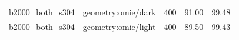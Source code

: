 \begin{longtable}{l>{\raggedright\arraybackslash}p{.42\linewidth}rrr}
b2000\_\allowbreak{}both\_\allowbreak{}s304 & %
geometry:omie/dark & %
400 & %
91.00 & %
99.48 \\ %

b2000\_\allowbreak{}both\_\allowbreak{}s304 & %
geometry:omie/light & %
400 & %
89.50 & %
99.43 \\ %


\end{longtable}
